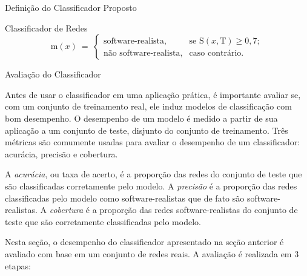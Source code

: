 \begin{section}{Definição do Classificador Proposto}
\begin{subsection}{Classificador de Redes}
$$
\mathrm{m}(x) ~=~
\left\{
\begin{array}{cl}
\mbox{software-realista,} & \mbox{se } \mathrm{S}(x, \mbox{T}) \ge 0,7; \\
\mbox{não software-realista,} & \mbox{caso contrário.}
\end{array}
\right.
$$



\end{subsection}
\end{section}

\begin{section}{Avaliação do Classificador} \label{cap:clas3}

	Antes de usar o classificador em uma aplicação prática, é importante avaliar se, com um conjunto de treinamento real, ele induz modelos de classificação com bom desempenho. O desempenho de um modelo é medido a partir de sua aplicação a um conjunto de teste, disjunto do conjunto de treinamento. Três métricas são comumente usadas para avaliar o desempenho de um classificador: acurácia, precisão e cobertura.

	A \emph{acurácia}, ou taxa de acerto, é a proporção das redes do conjunto de teste que são classificadas corretamente pelo modelo. A \emph{precisão} é a proporção das redes classificadas pelo modelo como software-realistas que de fato são software-realistas. A \emph{cobertura} é a proporção das redes software-realistas do conjunto de teste que são corretamente classificadas pelo modelo.
	
	Nesta seção, o desempenho do classificador apresentado na seção anterior é avaliado com base em um conjunto de redes reais. A avaliação é realizada em 3 etapas: 
	

\end{section}

